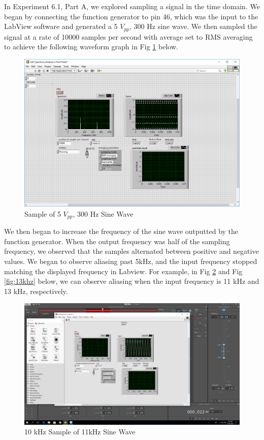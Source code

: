 \documentclass[10pt]{article}
\begin{document}
In Experiment 6.1, Part A, we explored sampling a signal in the time domain. We began by connecting the function generator to pin 46, which was the input to the LabView software and generated a 5 $V_{pp}$, 300 Hz sine wave. We then sampled the signal at a rate of 10000 samples per second with average set to RMS averaging to achieve the following waveform graph in Fig \ref{fig:firstsample} below. 

\begin{centering}
	\begin{figure} [H]
		\centering
		\includegraphics[scale=0.22]{images/61a2khzsample.PNG}
		\caption{Sample of 5 $V_{pp}$, 300 Hz Sine Wave}
		\label{fig:firstsample}
	\end{figure}
\end{centering}

We then began to increase the frequency of the sine wave outputted by the function generator. When the output frequency was half of the sampling frequency, we observed that the samples alternated between positive and negative values. We began to observe aliasing past 5kHz, and the input frequency stopped matching the displayed frequency in Labview. For example, in Fig \ref{fig:11khz} and Fig \ref{fig:13khz} below, we can observe aliasing when the input frequency is 11 kHz and 13 kHz, respectively. 

\begin{centering}
	\begin{figure} [H]
		\centering
		\includegraphics[scale=0.22]{images/51a11000input1000measured.PNG}
		\caption{10 kHz Sample of 11kHz Sine Wave}
		\label{fig:11khz}
	\end{figure}
\end{centering}
\end{document}
